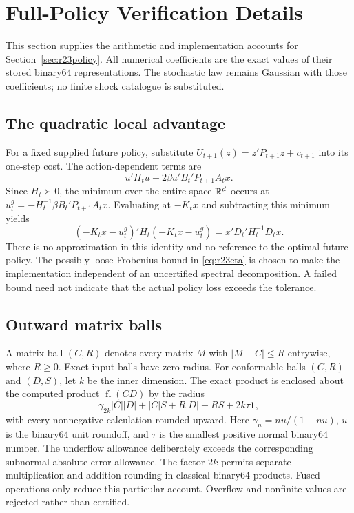 \section{Full-Policy Verification Details}\label{sec:r23proofs}
This section supplies the arithmetic and implementation accounts for
Section~\ref{sec:r23policy}. All numerical coefficients are the exact values
of their stored binary64 representations. The stochastic law remains
Gaussian with those coefficients; no finite shock catalogue is substituted.

\subsection{The quadratic local advantage}
For a fixed supplied future policy, substitute
$U_{t+1}(z)=z'P_{t+1}z+c_{t+1}$ into its one-step cost. The action-dependent
terms are
\[
 u'H_tu+2\beta u'B_t'P_{t+1}A_tx.
\]
Since $H_t\succ0$, the minimum over the entire space $\mathbb R^d$ occurs at
$u_t^g=-H_t^{-1}\beta B_t'P_{t+1}A_tx$. Evaluating at $-K_tx$ and subtracting
this minimum yields
\[
 (-K_tx-u_t^g)'H_t(-K_tx-u_t^g)=x'D_t'H_t^{-1}D_tx.
\]
There is no approximation in this identity and no reference to the optimal
future policy. The possibly loose Frobenius bound in
\eqref{eq:r23eta} is chosen to make the implementation independent of an
uncertified spectral decomposition. A failed bound need not indicate that
the actual policy loss exceeds the tolerance.

\subsection{Outward matrix balls}
A matrix ball $(C,R)$ denotes every matrix $M$ with
$|M-C|\leq R$ entrywise, where $R\geq0$. Exact input balls have zero radius.
For conformable balls $(C,R)$ and $(D,S)$, let $k$ be the inner dimension.
The exact product is enclosed about the computed product $\operatorname{fl}(CD)$
by the radius
\begin{equation}
 \gamma_{2k}|C||D|+|C|S+R|D|+RS+2k\tau\mathbf1,
 \label{eq:r23ballproduct}
\end{equation}
with every nonnegative calculation rounded upward. Here
$\gamma_n=nu/(1-nu)$, $u$ is the binary64 unit roundoff, and $\tau$ is the
smallest positive normal binary64 number. The underflow allowance deliberately
exceeds the corresponding subnormal absolute-error allowance. The factor
$2k$ permits separate multiplication and addition rounding in classical
binary64 products. Fused operations only reduce this particular account.
Overflow and nonfinite values are rejected rather than certified.

